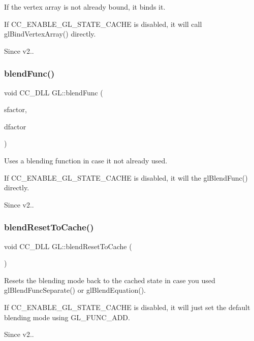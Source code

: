 If the vertex array is not already bound, it binds it.

If C\+C\+\_\+\+E\+N\+A\+B\+L\+E\+\_\+\+G\+L\+\_\+\+S\+T\+A\+T\+E\+\_\+\+C\+A\+C\+HE is disabled, it will call gl\+Bind\+Vertex\+Array() directly. \begin{DoxySince}{Since}
v2.. 
\end{DoxySince}
\mbox{\label{group__renderer_ga9ecd3206eccd7de4f79d000a5ba7cb0c}} 
\subsubsection{\texorpdfstring{blend\+Func()}{blendFunc()}}
{\footnotesize\ttfamily void C\+C\+\_\+\+D\+LL G\+L\+::blend\+Func (\begin{DoxyParamCaption}\item[{G\+Lenum}]{sfactor,  }\item[{G\+Lenum}]{dfactor }\end{DoxyParamCaption})}

Uses a blending function in case it not already used.

If C\+C\+\_\+\+E\+N\+A\+B\+L\+E\+\_\+\+G\+L\+\_\+\+S\+T\+A\+T\+E\+\_\+\+C\+A\+C\+HE is disabled, it will the gl\+Blend\+Func() directly. \begin{DoxySince}{Since}
v2.. 
\end{DoxySince}
\mbox{\label{group__renderer_gab8d542e76939f243e7da00a8abb9a08c}} 
\subsubsection{\texorpdfstring{blend\+Reset\+To\+Cache()}{blendResetToCache()}}
{\footnotesize\ttfamily void C\+C\+\_\+\+D\+LL G\+L\+::blend\+Reset\+To\+Cache (\begin{DoxyParamCaption}\item[{void}]{ }\end{DoxyParamCaption})}

Resets the blending mode back to the cached state in case you used gl\+Blend\+Func\+Separate() or gl\+Blend\+Equation().

If C\+C\+\_\+\+E\+N\+A\+B\+L\+E\+\_\+\+G\+L\+\_\+\+S\+T\+A\+T\+E\+\_\+\+C\+A\+C\+HE is disabled, it will just set the default blending mode using G\+L\+\_\+\+F\+U\+N\+C\+\_\+\+A\+DD. \begin{DoxySince}{Since}
v2.. 
\end{DoxySince}
\mbox{\label{group__renderer_gaad6e1d3b388bf7c8825b304bf2baf14a}} 
